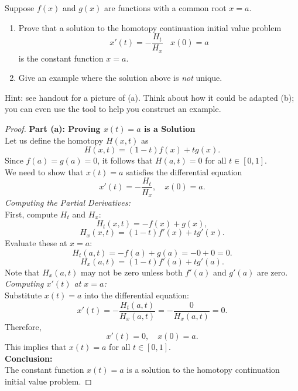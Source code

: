 \documentclass{article}
\begin{document}
\begin{problem}
    Suppose \(f(x)\) and \(g(x)\) are functions with a common root \(x=a\).
    \begin{enumerate}[\hspace{2em}a)]
        \item Prove that a solution to the homotopy continuation initial value problem
    \[x'(t) = -\frac{H_t}{H_x}\ \ \ \ x(0) = a\]
    is the constant function \(x=a\).
        \item Give an example where the solution above is \emph{not} unique.
    \end{enumerate}

    Hint: see handout for a picture of (a). Think about how it could be adapted (b); you can even use the tool to help you construct an example.
\end{problem}

\begin{proof}
    \textbf{Part (a): Proving \( x(t) = a \) is a Solution}
    \\
    Let us define the homotopy \( H(x, t) \) as
    \[
        H(x, t) = (1 - t) f(x) + t g(x).
    \]
    Since \( f(a) = g(a) = 0 \), it follows that \( H(a, t) = 0 \) for all \( t \in [0, 1] \).
    \\
    We need to show that \( x(t) = a \) satisfies the differential equation
    \[
        x'(t) = -\frac{H_t}{H_x}, \quad x(0) = a.
    \]
    \textit{Computing the Partial Derivatives:}
    \\
    First, compute \( H_t \) and \( H_x \):
    \[
        H_t(x, t) = -f(x) + g(x),
    \]
    \[
        H_x(x, t) = (1 - t) f'(x) + t g'(x).
    \]
    Evaluate these at \( x = a \):
    \[
        H_t(a, t) = -f(a) + g(a) = -0 + 0 = 0.
    \]
    \[
        H_x(a, t) = (1 - t) f'(a) + t g'(a).
    \]
    Note that \( H_x(a, t) \) may not be zero unless both \( f'(a) \) and \( g'(a) \) are zero.
    \\
    \textit{Computing \( x'(t) \) at \( x = a \):}
    \\
    Substitute \( x(t) = a \) into the differential equation:
    \[
        x'(t) = -\frac{H_t(a, t)}{H_x(a, t)} = -\frac{0}{H_x(a, t)} = 0.
    \]
    Therefore,
    \[
        x'(t) = 0, \quad x(0) = a.
    \]
    This implies that \( x(t) = a \) for all \( t \in [0, 1] \).
    \\
    \textbf{Conclusion:}
    \\
    The constant function \( x(t) = a \) is a solution to the homotopy continuation initial value problem.
\end{proof}
\end{document}
